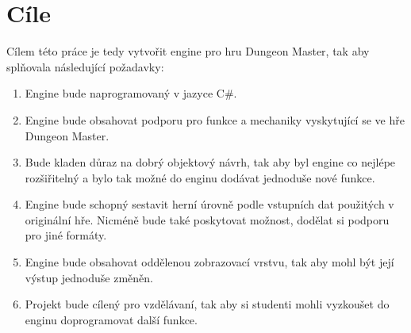 \section{Cíle}

Cílem této práce je tedy vytvořit engine pro hru Dungeon Master, tak aby splňovala následující požadavky:
\begin{enumerate}[label=\textbf{C\arabic*}]
\item Engine bude naprogramovaný v jazyce C\#.
\item\label{aim-mechanics} Engine bude obsahovat podporu pro funkce a mechaniky vyskytující se ve hře Dungeon Master.
\item\label{aim-extensibility} Bude kladen důraz na dobrý objektový návrh, tak aby byl engine co nejlépe rozšiřitelný a bylo 
	tak možné do enginu dodávat jednoduše nové funkce.
\item\label{aim-builders} Engine bude schopný sestavit herní úrovně podle vstupních dat použitých v originální hře. Nicméně
	bude také poskytovat možnost, dodělat si podporu pro jiné formáty.
\item\label{aim-rendering} Engine bude obsahovat oddělenou zobrazovací vrstvu, tak aby mohl být její výstup jednoduše změněn.
\item Projekt bude cílený pro vzdělávaní, tak aby si studenti mohli vyzkoušet do enginu doprogramovat další funkce.
\end{enumerate}
